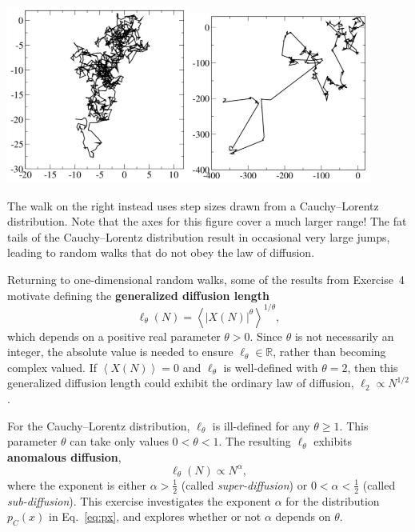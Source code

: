 \documentclass[12 pt]{article} %
\newcommand{\Rbb}{\ensuremath{\mathbb R} }
\newcommand{\al}{\ensuremath{\alpha} }
\newcommand{\vev}[1]{\ensuremath{\left\langle #1 \right\rangle} }
\newcommand{\eq}[1]{Eq.~\ref{#1}}
\begin{document}
\noindent\includegraphics[width=0.45\textwidth]{figs/diffusion_ordinary.pdf}\hfill \includegraphics[width=0.45\textwidth]{figs/diffusion_anomalous.pdf}

The walk on the right instead uses step sizes drawn from a Cauchy--Lorentz distribution.
Note that the axes for this figure cover a much larger range!
The fat tails of the Cauchy--Lorentz distribution result in occasional very large jumps, leading to random walks that do not obey the law of diffusion.

Returning to one-dimensional random walks, some of the results from Exercise~4 motivate defining the \textbf{generalized diffusion length}
\begin{equation}
  \label{eq:diff_length}
  \ell_{\theta}(N) = \vev{|X(N)|^{\theta}}^{1 / \theta},
\end{equation}
which depends on a positive real parameter $\theta > 0$.
Since $\theta$ is not necessarily an integer, the absolute value is needed to ensure $\ell_{\theta} \in \Rbb$, rather than becoming complex valued.
If $\vev{X(N)} = 0$ and $\ell_{\theta}$ is well-defined with $\theta = 2$, then this generalized diffusion length could exhibit the ordinary law of diffusion, $\ell_2 \propto N^{1 / 2}$.

For the Cauchy--Lorentz distribution, $\ell_{\theta}$ is ill-defined for any $\theta \geq 1$.
This parameter $\theta$ can take only values $0 < \theta < 1$.
The resulting $\ell_{\theta}$ exhibits \textbf{anomalous diffusion},
\begin{equation*}
  \ell_{\theta}(N) \propto N^{\al},
\end{equation*}
where the exponent is either $\al > \frac{1}{2}$ (called \textit{super-diffusion}) or $0 < \al < \frac{1}{2}$ (called \textit{sub-diffusion}).
This exercise investigates the exponent \al for the distribution $p_C(x)$ in \eq{eq:px}, and explores whether or not \al depends on $\theta$.
\end{document}
